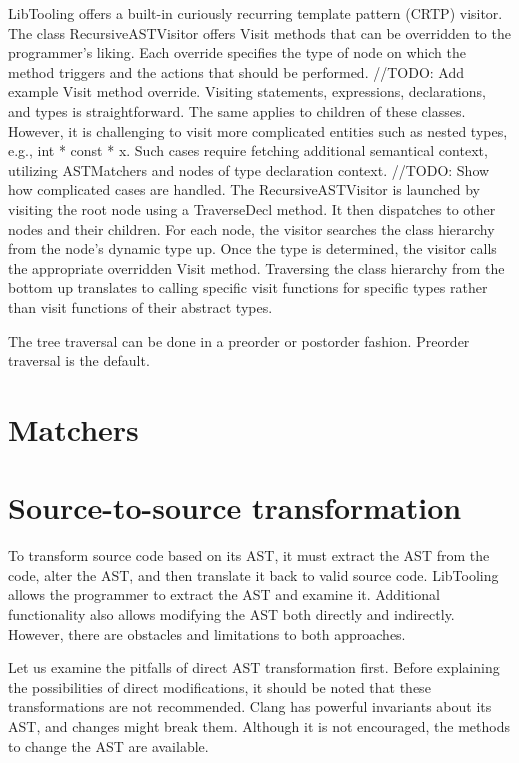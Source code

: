 LibTooling offers a built-in curiously recurring template pattern 
(CRTP) visitor. 
The class RecursiveASTVisitor offers Visit methods that 
can be overridden to the programmer's liking. 
Each override specifies the type of node on which the method 
triggers and the actions that should be performed.
//TODO: Add example Visit method override.
Visiting statements, expressions, declarations, 
and types is straightforward. 
The same applies to children of these classes. 
However, it is challenging to visit more complicated entities 
such as nested types, e.g., int * const * x. 
Such cases require fetching additional semantical context, 
utilizing ASTMatchers and nodes of type declaration context.
//TODO: Show how complicated cases are handled.
The RecursiveASTVisitor is launched by visiting the root node using 
a TraverseDecl method. 
It then dispatches to other nodes and their children. 
For each node, the visitor searches the class hierarchy from 
the node's dynamic type up. 
Once the type is determined, the visitor calls the appropriate 
overridden Visit method. 
Traversing the class hierarchy from the bottom up 
translates to calling specific visit functions for specific types 
rather than visit functions of their abstract types.

The tree traversal can be done in a preorder or postorder fashion. 
Preorder traversal is the default.

\section{Matchers}

\section{Source-to-source transformation}

To transform source code based on its AST, it must extract the AST 
from the code, alter the AST, and then translate it back to valid 
source code. 
LibTooling allows the programmer to extract the AST and examine it. 
Additional functionality also allows modifying the AST both directly 
and indirectly. 
However, there are obstacles and limitations to both approaches. 

Let us examine the pitfalls of direct AST transformation first. 
Before explaining the possibilities of direct modifications, it 
should be noted that these transformations are not recommended. 
Clang has powerful invariants about its AST, and changes might 
break them. 
Although it is not encouraged, the methods to change the AST 
are available.

